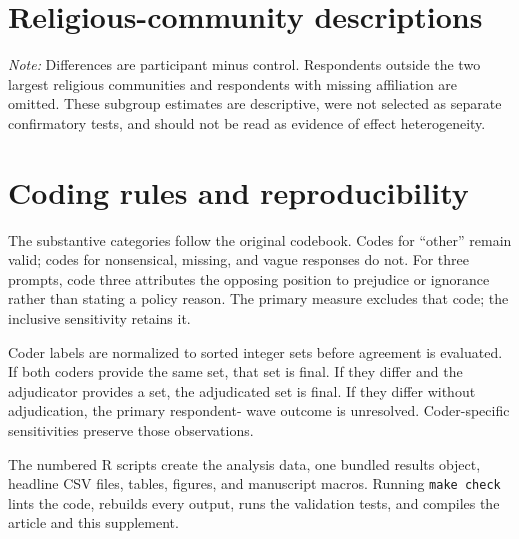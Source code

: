 \documentclass{article}
\begin{document}
\clearpage
\section{Religious-community descriptions}

\begin{table}[H]
\centering
\caption{T3 total repertoires by religious community}
\resizebox{0.98\textwidth}{!}{%

}
\begin{minipage}{0.95\textwidth}
\smallskip\footnotesize
\textit{Note:} Differences are participant minus control. Respondents outside the two largest
religious communities and respondents with missing affiliation are omitted. These subgroup
estimates are descriptive, were not selected as separate confirmatory tests, and should not be
read as evidence of effect heterogeneity.
\end{minipage}
\end{table}

\section{Coding rules and reproducibility}

The substantive categories follow the original codebook. Codes for ``other'' remain valid;
codes for nonsensical, missing, and vague responses do not. For three prompts, code three
attributes the opposing position to prejudice or ignorance rather than stating a policy reason.
The primary measure excludes that code; the inclusive sensitivity retains it.

Coder labels are normalized to sorted integer sets before agreement is evaluated. If both
coders provide the same set, that set is final. If they differ and the adjudicator provides a
set, the adjudicated set is final. If they differ without adjudication, the primary respondent-
wave outcome is unresolved. Coder-specific sensitivities preserve those observations.

The numbered R scripts create the analysis data, one bundled results object,
headline CSV files, tables, figures, and manuscript macros. Running \texttt{make check} lints
the code, rebuilds every output, runs the validation tests, and compiles the article and this
supplement.
\end{document}
